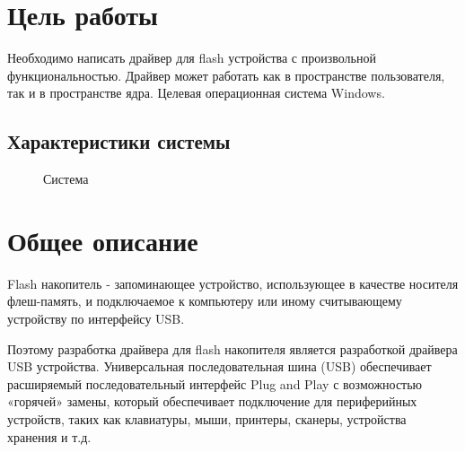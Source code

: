 \documentclass[14pt,a4paper]{article}
\begin{document}





\section{Цель работы}
\par Необходимо написать драйвер для flash устройства с произвольной функциональностью. Драйвер может работать как в пространстве пользователя, так и в пространстве ядра. Целевая операционная система Windows.

\subsection{Характеристики системы}
\begin{figure}[H]
  \centering
  \caption{Система}
\end{figure}

\section{Общее описание}

\par Flash накопитель - запоминающее устройство, использующее в качестве носителя флеш-память, и подключаемое к компьютеру или иному считывающему устройству по интерфейсу USB.\\

\par Поэтому разработка драйвера для flash накопителя является разработкой драйвера USB устройства.
Универсальная последовательная шина (USB) обеспечивает расширяемый последовательный интерфейс Plug and Play с возможностью «горячей» замены, который обеспечивает подключение для периферийных устройств, таких как клавиатуры, мыши, принтеры, сканеры, устройства хранения и т.д.\\
\end{document}
